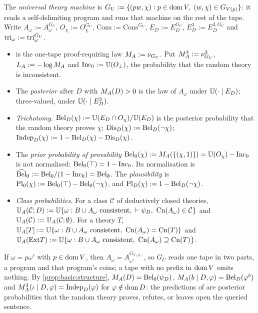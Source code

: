 \begin{definition}[\SAI]\label{def:setting:MA}
The \emph{universal theory machine} is $G_U:=\{(pw,\chi):p\in\operatorname{dom} V,\ (w,\chi)\in G_{V(p)}\}$: it reads a self-delimiting program and runs that machine on the rest of the tape. Write $A_\omega:=A^{G_U}_\omega$, $O_\chi:=O^{G_U}_\chi$, $\mathrm{Cons}:=\mathrm{Cons}^{G_U}$, $E_D:=E^{G_U}_D$, $E^3_D:=E^{3,G_U}_D$ and $\mathrm{tri}_\omega:=\mathrm{tri}^{G_U}_\omega$.
\begin{itemize}[leftmargin=*]
\item \emph{\SAIabbr} is the one-tape proof-requiring law $M_{A}:=\nu_{G_U}$. Put $M_{A}^{3}:=\nu^3_{G_U}$, $L_{A}:=-\log M_{A}$ and $\mathrm{Inc}_0:=\mathbb{U}(O_\bot)$, the probability that the random theory is inconsistent.
\item The \emph{posterior} after $D$ with $M_{A}(D)>0$ is the law of $A_\omega$ under $\mathbb{U}(\cdot\mid E_D)$; three-valued, under $\mathbb{U}(\cdot\mid E^3_D)$.
\item \emph{Trichotomy.} $\mathrm{Bel}_D(\chi):=\mathbb{U}(E_D\cap O_\chi)/\mathbb{U}(E_D)$ is the posterior probability that the random theory proves $\chi$; $\mathrm{Dis}_D(\chi):=\mathrm{Bel}_D(\neg\chi)$; $\mathrm{Indep}_D(\chi):=1-\mathrm{Bel}_D(\chi)-\mathrm{Dis}_D(\chi)$.
\item The \emph{prior probability of provability} $\mathrm{Bel}_0(\chi):=M_{A}(\{(\chi,1)\})=\mathbb{U}(O_\chi)-\mathrm{Inc}_0$ is not normalised: $\mathrm{Bel}_0(\top)=1-\mathrm{Inc}_0$. Its normalisation is $\widehat{\mathrm{Bel}}_0:=\mathrm{Bel}_0/(1-\mathrm{Inc}_0)=\mathrm{Bel}_\emptyset$. The \emph{plausibility} is $\mathrm{Pl}_0(\chi):=\mathrm{Bel}_0(\top)-\mathrm{Bel}_0(\neg\chi)$, and $\mathrm{Pl}_D(\chi):=1-\mathrm{Bel}_D(\neg\chi)$.
\item \emph{Class probabilities.} For a class $\mathcal C$ of deductively closed theories, $\UA(\mathcal C;D):=\Unif\{\omega:B\cup A_\omega\text{ consistent},\ \vdash\psi_D,\ \Cn(A_\omega)\in\mathcal C\}$ and $\mathbb{U}_{A}(\mathcal C):=\mathbb{U}_{A}(\mathcal C;\emptyset)$. For a theory $T$, $\mathbb{U}_{A}[T]:=\mathbb{U}\{\omega:B\cup A_\omega\text{ consistent},\ \mathrm{Cn}(A_\omega)=\mathrm{Cn}(T)\}$ and $\mathbb{U}_{A}(\mathrm{Ext} T):=\mathbb{U}\{\omega:B\cup A_\omega\text{ consistent},\ \mathrm{Cn}(A_\omega)\supseteq\mathrm{Cn}(T)\}$.
\end{itemize}
\end{definition}

If $\omega=p\omega'$ with $p\in\operatorname{dom} V$, then $A_\omega=A^{G_{V(p)}}_{\omega'}$, so $G_U$ reads one tape in two parts, a program and that program's coins; a tape with no prefix in $\operatorname{dom} V$ emits nothing. By \cref{prop:basic:structure}, $M_{A}(D)=\mathrm{Bel}_0(\psi_D)$, $M_{A}(b\mid D,\varphi)=\mathrm{Bel}_D(\varphi^b)$ and $M_{A}^{3}(\iota\mid D,\varphi)=\mathrm{Indep}_D(\varphi)$ for $\varphi\notin\operatorname{dom} D$: the predictions of \SAIabbr are posterior probabilities that the random theory proves, refutes, or leaves open the queried sentence.

